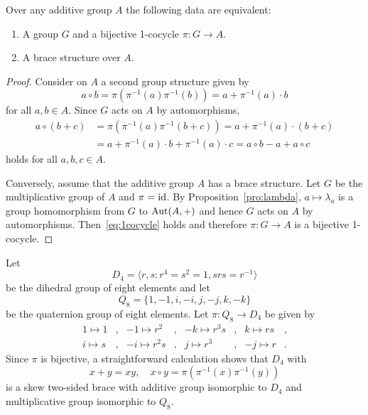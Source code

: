 \begin{theorem}
	\label{thm:1cocycle}
    Over any additive group $A$ the following data are equivalent:
    \begin{enumerate}
        \item A group $G$ and a bijective
            1-cocycle $\pi\colon G\to A$. 
        \item A brace structure over $A$. 
    \end{enumerate}

    \begin{proof}
        Consider on $A$ a second group structure given by 
        \[
		a\circ b=\pi(\pi^{-1}(a)\pi^{-1}(b))=a+\pi^{-1}(a)\cdot b
		\]
		for all
        $a,b\in A$.  Since $G$ acts on $A$ by
        automorphisms, 
        \begin{align*}
            a\circ (b+c)&=\pi(\pi^{-1}(a)\pi^{-1}(b+c))=a+\pi^{-1}(a)\cdot (b+c)\\
            &=a+ \pi^{-1}(a)\cdot b+\pi^{-1}(a)\cdot c
            =a\circ b-a+a\circ c
        \end{align*}
        holds for all $a,b,c\in A$.
        
        Conversely, assume that the additive group $A$ has a brace structure. Let $G$ be the multiplicative group of $A$
        and $\pi=\operatorname{id}$. By
        Proposition~\ref{pro:lambda}, $a\mapsto\lambda_a$ is a group homomorphism from $G$ to $\operatorname{Aut}(A,+)$ and 
        hence $G$ acts on $A$ by automorphisms. Then~\eqref{eq:1cocycle} holds
        and therefore $\pi\colon G\to A$ is a bijective 1-cocycle. 
    \end{proof}
\end{theorem}


\begin{example}
	\label{exa:d8q8}
	Let 
	\[
	D_4=\langle r,s:r^4=s^2=1,srs=r^{-1}\rangle
	\]
	be the dihedral group of eight elements and let
	\[
	Q_8=\{1,-1,i,-i,j,-j,k,-k\}
	\]
	be the quaternion group of eight elements.  Let
	$\pi:Q_8\to D_4$ be given by 
	\begin{align*}
		1\mapsto 1 &, & -1\mapsto r^2 &,  & -k\mapsto r^3s &,&  k\mapsto rs &,\\
		i\mapsto s &, & -i\mapsto r^2s &, &  j\mapsto r^3 &, & -j\mapsto r &.
	\end{align*}
	Since $\pi$ is bijective, 
	a straightforward calculation shows that $D_4$ with 
	\[
	  x+y=xy,\quad 
	  x\circ y=\pi(\pi^{-1}(x)\pi^{-1}(y))
	\]
	is a skew two-sided brace with additive group isomorphic to $D_4$ and multiplicative group
	isomorphic to $Q_8$. 
\end{example}

